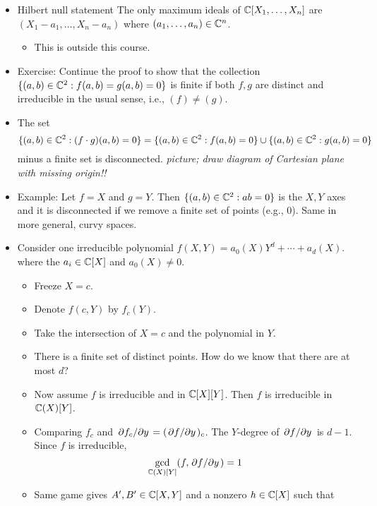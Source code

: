 \documentclass[../notes.tex]{subfiles}
\begin{document}
\begin{itemize}
\begin{proof}
    \end{proof}
    \item Hilbert null statement The only maximum ideals of $\mathbb{C}[X_1,\dots,X_n]$ are $(X_1-a_1,\dots,X_n-a_n)$ where $(a_1,\dots,a_n)\in\mathbb{C}^n$.
    \begin{itemize}
        \item This is outside this course.
    \end{itemize}
    \item Exercise: Continue the proof to show that the collection $\{(a,b)\in\mathbb{C}^2:f(a,b)=g(a,b)=0\}$ is finite if both $f,g$ are distinct and irreducible in the usual sense, i.e., $(f)\neq(g)$.
    \item The set
    \begin{equation*}
        \{(a,b)\in\mathbb{C}^2:(f\cdot g)(a,b)=0\} = \{(a,b)\in\mathbb{C}^2:f(a,b)=0\}\cup\{(a,b)\in\mathbb{C}^2:g(a,b)=0\}
    \end{equation*}
    minus a finite set is disconnected.
    \emph{picture; draw diagram of Cartesian plane with missing origin!!}
    \item Example: Let $f=X$ and $g=Y$. Then $\{(a,b)\in\mathbb{C}^2:ab=0\}$ is the $X,Y$ axes and it is disconnected if we remove a finite set of points (e.g., 0). Same in more general, curvy spaces.
    \item Consider one irreducible polynomial $f(X,Y)=a_0(X)Y^d+\cdots+a_d(X)$. where the $a_i\in\mathbb{C}[X]$ and $a_0(X)\neq 0$.
    \begin{itemize}
        \item Freeze $X=c$.
        \item Denote $f(c,Y)$ by $f_c(Y)$.
        \item Take the intersection of $X=c$ and the polynomial in $Y$.
        \item There is a finite set of distinct points. How do we know that there are at most $d$?
        \item Now assume $f$ is irreducible and in $\mathbb{C}[X][Y]$. Then $f$ is irreducible in $\mathbb{C}(X)[Y]$.
        \item Comparing $f_c$ and $\pdv*{f_c}{y}=(\pdv*{f}{y})_c$. The $Y$-degree of $\pdv*{f}{y}$ is $d-1$. Since $f$ is irreducible,
        \begin{equation*}
            \gcd_{\mathbb{C}(X)[Y]}(f,\pdv*{f}{y}) = 1
        \end{equation*}
        \item Same game gives $A',B'\in\mathbb{C}[X,Y]$ and a nonzero $h\in\mathbb{C}[X]$ such that
        \begin{equation*}

\end{equation*}
\end{itemize}
\end{itemize}
\end{document}
